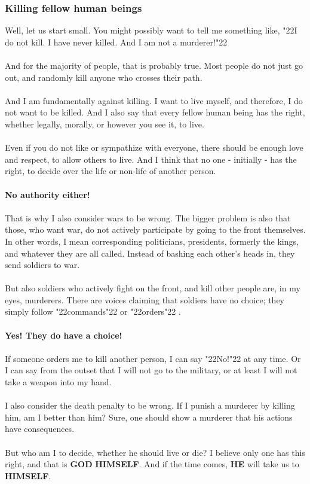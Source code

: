 \documentclass[12pt,a5paper]{article}
\newcommand{\God}[0]{\textbf{GOD}}
\newcommand{\He}[0]{\textbf{HE}}
\newcommand{\Himself}[0]{\textbf{HIMSELF}}
\newcommand{\q}[1]{\char"22{#1}\char"22 }
\begin{document}
	\subsubsection{Killing fellow human beings}
		Well,
		let us start small.
		You might possibly want to tell me something like,
		\q{I do not kill.
		I have never killed.
		And I am not a murderer!}
		\\
		\\
		And for the majority of people,
		that is probably true.
		Most people do not just go out,
		and randomly kill anyone who crosses their path.
		\\
		\\
		And I am fundamentally against killing.
		I want to live myself,
		and therefore,
		I do not want to be killed.
		And I also say that every fellow human being has the right,
		whether legally,
		morally,
		or however you see it,
		to live.
		\\
		\\
		Even if you do not like or sympathize with everyone,
		there should be enough love and respect,
		to allow others to live.
		And I think that no one - initially - has the right,
		to decide over the life or non-life of another person.
		\\
		\\
		\textbf{No authority either!}
		\\
		\\
		That is why I also consider wars to be wrong.
		The bigger problem is also that those,
		who want war,
		do not actively participate by going to the front themselves.
		In other words,
		I mean corresponding politicians,
		presidents,
		formerly the kings,
		and whatever they are all called.
		Instead of bashing each other's heads in,
		they send soldiers to war.
		\\
		\\
		But also soldiers who actively fight on the front,
		and kill other people are,
		in my eyes,
		murderers.
		There are voices claiming that soldiers have no choice;
		they simply follow \q{commands} or \q{orders}.
		\\
		\\
		\textbf{Yes!
		They do have a choice!}
		\\
		\\
		If someone orders me to kill another person,
		I can say \q{No!} at any time.
		Or I can say from the outset that I will not go to the military,
		or at least I will not take a weapon into my hand.
		\\
		\\
		I also consider the death penalty to be wrong.
		If I punish a murderer by killing him,
		am I better than him?
		Sure,
		one should show a murderer that his actions have consequences.
		\\
		\\
		But who am I to decide,
		whether he should live or die?
		I believe only one has this right,
		and that is {\God} {\Himself}.
		And if the time comes,
		{\He} will take us to {\Himself}.
		
\end{document}
